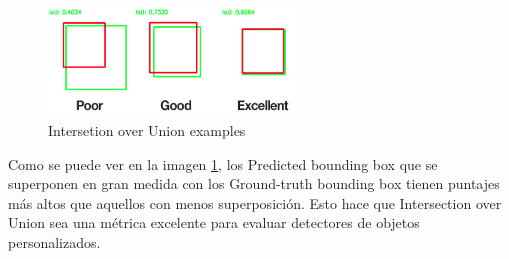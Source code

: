 \begin{figure}[h!]
    \centering
    \includegraphics[width=0.6\textwidth]{img/iou-3.png}
    \caption{Intersetion over Union examples}
    \label{fig:iou ejemplos}
\end{figure}

Como se puede ver en la imagen \ref{fig:iou ejemplos}, los Predicted bounding box que se superponen en gran medida con los Ground-truth bounding box tienen puntajes más altos que aquellos con menos superposición. Esto hace que Intersection over Union sea una métrica excelente para evaluar detectores de objetos personalizados.


\newpage